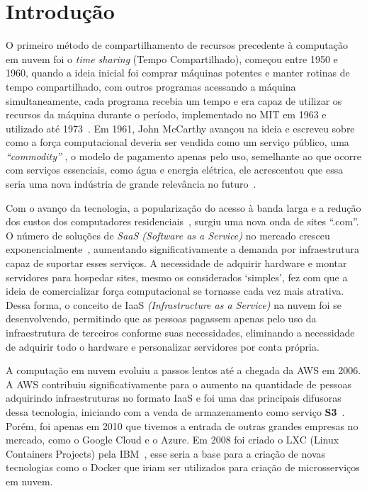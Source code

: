 \chapter{Introdução}
\label{chp:introduction}

O primeiro método de compartilhamento de recursos precedente à computação em nuvem foi o \textit{time sharing} (Tempo Compartilhado), começou entre 1950 e 1960, quando a ideia inicial foi comprar máquinas potentes e manter rotinas de tempo compartilhado, com outros programas acessando a máquina simultaneamente, cada programa recebia um tempo e era capaz de utilizar os recursos da máquina durante o período, implementado no MIT em 1963 e utilizado até 1973~\citep{HistoryOfCloudByIBM}. Em 1961, John McCarthy avançou na ideia e escreveu sobre como a força computacional deveria ser vendida como um serviço público, uma \textit{``commodity''} \citep[History Cloud]{arutyunov2012cloud}, o modelo de pagamento apenas pelo uso, semelhante ao que ocorre com serviços essenciais, como água e energia elétrica, ele acrescentou que essa seria uma nova indústria de grande relevância no futuro~\citep{qian2009cloud}.

Com o avanço da tecnologia, a popularização do acesso à banda larga e a redução dos custos dos computadores residenciais~\citep{qian2009cloud}, surgiu uma nova onda de sites ``.com''. O número de soluções de \textit{SaaS (Software as a Service)} no mercado cresceu exponencialmente~\citep{InternetLiveWebsites}, aumentando significativamente a demanda por infraestrutura capaz de suportar esses serviços. A necessidade de adquirir hardware e montar servidores para hospedar sites, mesmo os considerados `simples', fez com que a ideia de comercializar força computacional se tornasse cada vez mais atrativa. Dessa forma, o conceito de IaaS \textit{(Infrastructure as a Service)} na nuvem foi se desenvolvendo, permitindo que as pessoas pagassem apenas pelo uso da infraestrutura de terceiros conforme suas necessidades, eliminando a necessidade de adquirir todo o hardware e personalizar servidores por conta própria.

A computação em nuvem evoluiu a passos lentos até a chegada da AWS em 2006. A AWS contribuiu significativamente para o aumento na quantidade de pessoas adquirindo infraestruturas no formato IaaS e foi uma das principais difusoras dessa tecnologia, iniciando com a venda de armazenamento como serviço \textbf{S3}~\citep{AWSlauch}. Porém, foi apenas em 2010 que tivemos a entrada de outras grandes empresas no mercado, como o Google Cloud e o Azure. Em 2008 foi criado o LXC (Linux Containers Projects) pela IBM~\citep{HistoryOfContainers}, esse seria a base para a criação de novas tecnologias como o Docker que iriam ser utilizados para criação de microsserviços em nuvem. 

